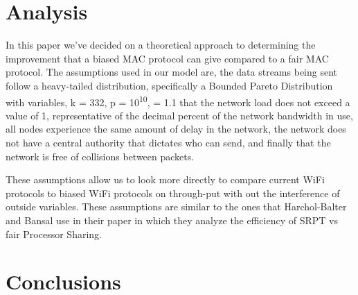 \documentclass{sigcomm-alternate}
\begin{document}
\section{Analysis}
\label{section:analysis}


In this paper we've decided on a theoretical approach to determining the improvement that a biased MAC protocol can give compared to a fair MAC protocol. The assumptions used in our model are, the data streams being sent follow a heavy-tailed distribution, specifically a Bounded Pareto Distribution with variables, k = 332, p = 10\textsuperscript{10}, \textalpha  = 1.1
 that the network load does not exceed a value of 1, representative of the decimal percent of the network bandwidth in use, all nodes experience the same amount of delay in the network, the network does not have a central authority that dictates who can send, and finally that the network is free of collisions between packets. 

These assumptions allow us to look more directly to compare current WiFi protocols to biased WiFi protocols on through-put with out the interference of outside variables. These assumptions are similar to the ones that Harchol-Balter and Bansal use in their paper \cite{Unfair} in which they analyze the efficiency of SRPT vs fair Processor Sharing. 


\section{Conclusions}
\label{section:conclusions}

 





\balancecolumns
\end{document}

